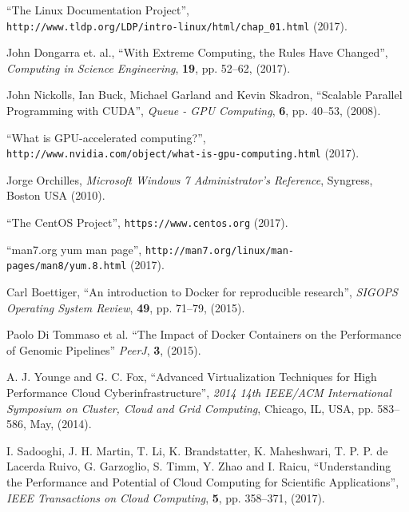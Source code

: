 \documentclass[twoside,a4paper,12pt,english]{inac19}
\begin{document}
\begin{thebibliography}{99} %

 ``The Linux Documentation Project'', \\\verb#http://www.tldp.org/LDP/intro-linux/html/chap_01.html# (2017).

 John Dongarra et. al., ``With Extreme Computing, the Rules Have Changed'', \textit{Computing in Science Engineering}, \textbf{19}, pp. 52--62, (2017).

 John Nickolls, Ian Buck, Michael Garland and Kevin Skadron, ``Scalable Parallel Programming with CUDA'', \textit{Queue - GPU Computing}, \textbf{6}, pp. 40--53, (2008).

 ``What is GPU-accelerated computing?'', \\\verb#http://www.nvidia.com/object/what-is-gpu-computing.html# (2017).

 Jorge Orchilles, \textit{Microsoft Windows 7 Administrator's Reference}, Syngress, Boston USA (2010).
  
 ``The CentOS Project'', \verb#https://www.centos.org# (2017).

 ``man7.org yum man page'', \verb#http://man7.org/linux/man-pages/man8/yum.8.html# (2017).
  
 Carl Boettiger, ``An introduction to Docker for reproducible research'', \textit{SIGOPS Operating System Review}, \textbf{49}, pp. 71--79, (2015).

 Paolo Di Tommaso et al. ``The Impact of Docker Containers on the Performance of Genomic Pipelines'' \textit{PeerJ}, \textbf{3}, (2015).

 A. J. Younge and G. C. Fox, ``Advanced Virtualization Techniques for High Performance Cloud Cyberinfrastructure'', \textit{2014 14th IEEE/ACM International Symposium on Cluster, Cloud and Grid Computing}, Chicago, IL, USA, pp. 583--586, May, (2014).
  
 I. Sadooghi, J. H. Martin, T. Li, K. Brandstatter, K. Maheshwari, T. P. P. de Lacerda Ruivo, G. Garzoglio, S. Timm, Y. Zhao and I. Raicu, ``Understanding the Performance and Potential of Cloud Computing for Scientific Applications'', \textit{IEEE Transactions on Cloud Computing}, \textbf{5}, pp. 358--371, (2017).
  

\end{thebibliography}
\end{document}
